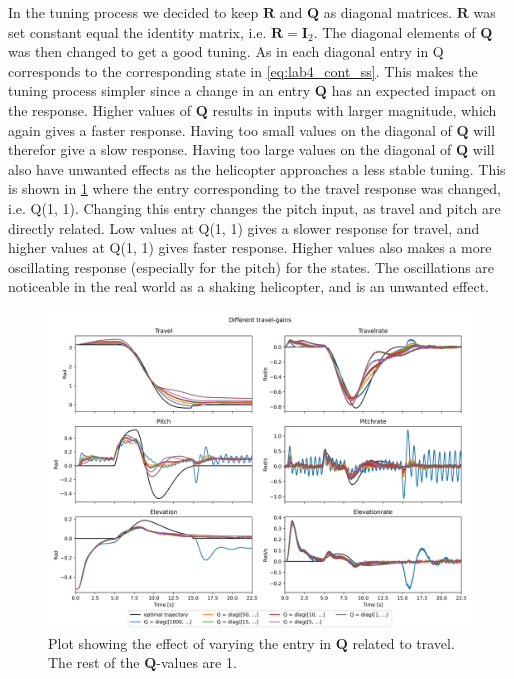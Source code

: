 \documentclass[../main.tex]{subfiles}
\begin{document}
In the tuning process we decided to keep $ \bm R $ and $ \bm Q $ as diagonal matrices. $ \bm R $ was set constant equal the identity matrix, i.e. $\bm R = \bm I_2$. The diagonal elements of $ \bm Q $ was then changed to get a good tuning. As in each diagonal entry in Q corresponds to the corresponding state in \cref{eq:lab4_cont_ss}. This makes the tuning process simpler since a change in an entry $ \bm Q $ has an expected impact on the response. Higher values of $ \bm Q $ results in inputs with larger magnitude, which again gives a faster response. Having too small values on the diagonal of $ \bm Q $ will therefor give a slow response. Having too large values on the diagonal of $ \bm Q $ will also have unwanted effects as the helicopter approaches a less stable tuning. This is shown in \cref{fig:lab4_diff_Q_values} where the entry corresponding to the travel response was changed, i.e. Q(1, 1). Changing this entry changes the pitch input, as travel and pitch are directly related. Low values at Q(1, 1) gives a slower response for travel, and higher values at Q(1, 1) gives faster response. Higher values also makes a more oscillating response (especially for the pitch) for the states. The oscillations are noticeable in the real world as a shaking helicopter, and is an unwanted effect. 
\begin{figure}[h]
	\centering
	\includegraphics[width=\linewidth]{figures/LAB4_travel_gains.png}
	\caption{Plot showing the effect of varying the entry in $ \bm Q $ related to travel. The rest of the $ \bm Q $-values are 1.}
	\label{fig:lab4_diff_Q_values}
\end{figure}
\end{document}
